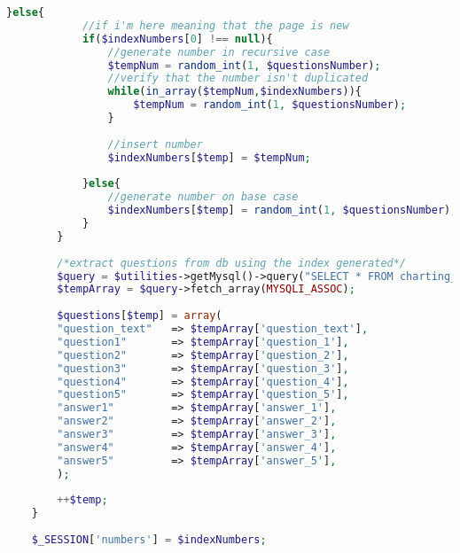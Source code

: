 \begin{lstlisting}[language=php]
		}else{
			//if i'm here meaning that the page is new
			if($indexNumbers[0] !== null){
				//generate number in recursive case
				$tempNum = random_int(1, $questionsNumber);
				//verify that the number isn't duplicated
				while(in_array($tempNum,$indexNumbers)){
					$tempNum = random_int(1, $questionsNumber);
				}
				
				//insert number
				$indexNumbers[$temp] = $tempNum;
				
			}else{
				//generate number on base case
				$indexNumbers[$temp] = random_int(1, $questionsNumber);
			}
		}
		
		/*extract questions from db using the index generated*/
		$query = $utilities->getMysql()->query("SELECT * FROM charting_elements WHERE (id = '{$indexNumbers[$temp]}')");
		$tempArray = $query->fetch_array(MYSQLI_ASSOC);
		
		$questions[$temp] = array(
		"question_text"   => $tempArray['question_text'],
		"question1"       => $tempArray['question_1'],
		"question2"       => $tempArray['question_2'],
		"question3"       => $tempArray['question_3'],
		"question4"       => $tempArray['question_4'],
		"question5"       => $tempArray['question_5'],
		"answer1"         => $tempArray['answer_1'],
		"answer2"         => $tempArray['answer_2'],
		"answer3"         => $tempArray['answer_3'],
		"answer4"         => $tempArray['answer_4'],
		"answer5"         => $tempArray['answer_5'],
		);
		
		++$temp;
	}
	
	$_SESSION['numbers'] = $indexNumbers;
\end{lstlisting}

